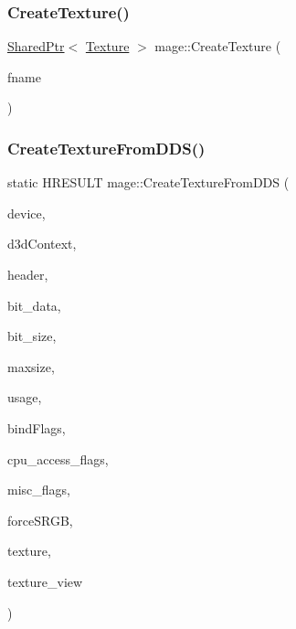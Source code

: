 \hypertarget{namespacemage_ac27913e621bde0fd01312183aafaaca0}{}\label{namespacemage_ac27913e621bde0fd01312183aafaaca0} 
\subsubsection{\texorpdfstring{Create\+Texture()}{CreateTexture()}}
{\footnotesize\ttfamily \hyperlink{namespacemage_a1e01ae66713838a7a67d30e44c67703e}{Shared\+Ptr}$<$ \hyperlink{classmage_1_1_texture}{Texture} $>$ mage\+::\+Create\+Texture (\begin{DoxyParamCaption}\item[{const wstring \&}]{fname }\end{DoxyParamCaption})}

\hypertarget{namespacemage_a84aaf5ce730cb63cb50fac23aeb3d4a4}{}\label{namespacemage_a84aaf5ce730cb63cb50fac23aeb3d4a4} 
\subsubsection{\texorpdfstring{Create\+Texture\+From\+D\+D\+S()}{CreateTextureFromDDS()}}
{\footnotesize\ttfamily static H\+R\+E\+S\+U\+LT mage\+::\+Create\+Texture\+From\+D\+DS (\begin{DoxyParamCaption}\item[{\+\_\+\+In\+\_\+ \hyperlink{namespacemage_ae74f374780900893caa5555d1031fd79}{Com\+Ptr}$<$ I\+D3\+D11\+Device2 $>$}]{device,  }\item[{\+\_\+\+In\+\_\+opt\+\_\+ I\+D3\+D11\+Device\+Context $\ast$}]{d3d\+Context,  }\item[{\+\_\+\+In\+\_\+ const \hyperlink{structmage_1_1_d_d_s___h_e_a_d_e_r}{D\+D\+S\+\_\+\+H\+E\+A\+D\+ER} $\ast$}]{header,  }\item[{\+\_\+\+In\+\_\+reads\+\_\+bytes\+\_\+(bit\+\_\+size) const uint8\+\_\+t $\ast$}]{bit\+\_\+data,  }\item[{\+\_\+\+In\+\_\+ size\+\_\+t}]{bit\+\_\+size,  }\item[{\+\_\+\+In\+\_\+ size\+\_\+t}]{maxsize,  }\item[{\+\_\+\+In\+\_\+ D3\+D11\+\_\+\+U\+S\+A\+GE}]{usage,  }\item[{\+\_\+\+In\+\_\+ uint32\+\_\+t}]{bind\+Flags,  }\item[{\+\_\+\+In\+\_\+ uint32\+\_\+t}]{cpu\+\_\+access\+\_\+flags,  }\item[{\+\_\+\+In\+\_\+ uint32\+\_\+t}]{misc\+\_\+flags,  }\item[{\+\_\+\+In\+\_\+ bool}]{force\+S\+R\+GB,  }\item[{\+\_\+\+Outptr\+\_\+opt\+\_\+ I\+D3\+D11\+Resource $\ast$$\ast$}]{texture,  }\item[{\+\_\+\+Outptr\+\_\+opt\+\_\+ I\+D3\+D11\+Shader\+Resource\+View $\ast$$\ast$}]{texture\+\_\+view }\end{DoxyParamCaption})\hspace{0.3cm}{\ttfamily [static]}}

